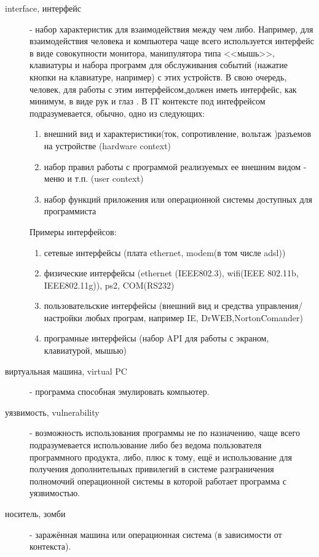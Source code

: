 \begin{description}
\item [ interface, интерфейс ]
 - набор характеристик для взаимодействия между чем либо. Например,
для взаимодействия человека и компьютера чаще всего используется интерфейс в виде совокупности
монитора, манипулятора типа <<мышь>>, клавиатуры и набора программ для обслуживания событий
(нажатие кнопки на клавиатуре, например) с этих устройств. В свою очередь, человек, для
работы с этим интерфейсом,должен иметь интерфейс, как минимум, в виде рук и глаз . В IT
контексте под интефрейсом подразумевается, обычно, одно из следующих:
\begin{enumerate}
\item{внешний вид и характеристики(ток, сопротивление, вольтаж )разъемов на устройстве
(hardware context)}
\item{набор правил работы с программой реализуемых ее внешним видом - меню и т.п. (user context)}
\item{набор функций приложения или операционной системы доступных для программиста}
\end{enumerate}
Примеры интерфейсов:
\begin{enumerate}
\item{сетевые интерфейсы (плата ethernet, modem(в том числе adsl))}
\item{физические интерфейсы (ethernet (IEEE802.3), wifi(IEEE 802.11b, IEEE802.11g)), ps2, COM(RS232)}
\item{пользовательские интерфейсы (внешний вид и средства управления/настройки любых програм,
например IE, DrWEB,NortonComander)}
\item{програмные интерфейсы (набор API для работы с экраном, клавиатурой, мышью)}
\end{enumerate}

\item[виртуальная машина, virtual PC]
 - программа способная эмулировать компьютер.

\item[уязвимость, vulnerability]
 - возможность использования программы не по назначению, чаще
всего подразумевается использование либо без ведома пользователя программного продукта, либо, плюс
к тому, ещё и использование для получения дополнительных привилегий в системе разграничения
полномочий операционной системы в которой работает программа с уязвимостью.

\item[носитель, зомби]
 - заражённая машина или операционная система (в зависимости от контекста).


\end{description}
